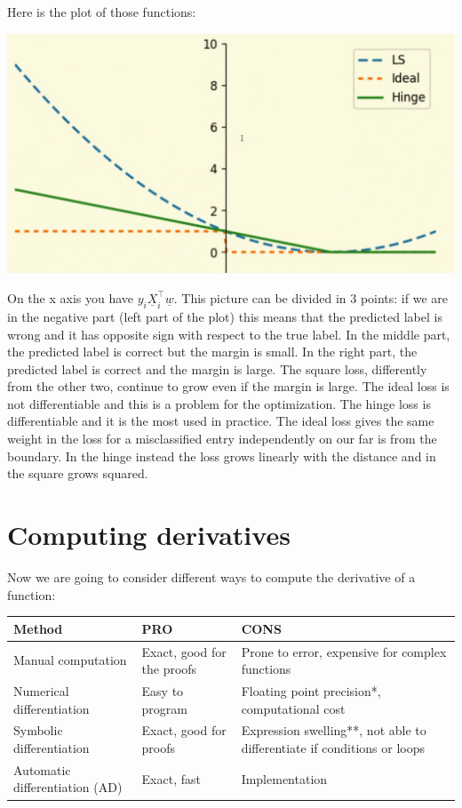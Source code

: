 Here is the plot of those functions:
\begin{center}
    \includegraphics[]{../images/LossFunctions.jpg}
\end{center}
On the x axis you have $y_i\underline{X}_i^\intercal \underline{w}$. This picture can be divided in 3 points: if we are in the negative part (left part of the plot) this means that the predicted label is wrong and it has opposite sign with respect to the true label. In the middle part, the predicted label is correct but the margin is small. In the right part, the predicted label is correct and the margin is large. The square loss, differently from the other two, continue to grow even if the margin is large. The ideal loss is not differentiable and this is a problem for the optimization. The hinge loss is differentiable and it is the most used in practice. The ideal loss gives the same weight in the loss for a misclassified entry independently on our far is from the boundary. In the hinge instead the loss grows linearly with the distance and in the square grows squared. \\ 


\section{Computing derivatives}
Now we are going to consider different ways to compute the derivative of a function:
\begin{center}
    \begin{tabular}{|| m{14em} | m{12em} | m{20em} ||} 
     \hline
     Method & PRO & CONS \\ [0.5ex] 
     \hline\hline
     Manual computation & Exact, good for the proofs & Prone to error, expensive for complex functions\\ 
     \hline
     Numerical differentiation & Easy to program & Floating point precision*, computational cost\\
     \hline
     Symbolic differentiation & Exact, good for proofs &  Expression swelling**, not able to differentiate if conditions or loops  \\
     \hline
     Automatic differentiation (AD) & Exact, fast & Implementation \\
     \hline
    \end{tabular}
\end{center}

